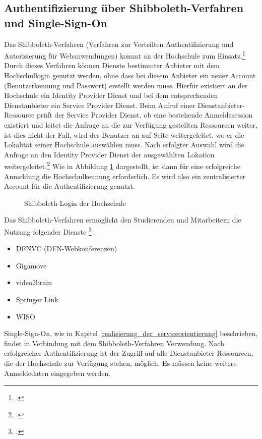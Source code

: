 \subsection{Authentifizierung über Shibboleth-Verfahren und Single-Sign-On}
\label{shibboleth_sso} 

Das Shibboleth-Verfahren (Verfahren zur Verteilten Authentifizierung und Autorisierung für 
Webanwendungen) kommt an der Hochschule zum Einsatz.\footcite[Vgl.][]{hsel_shibboleth_auth_2015}  
Durch dieses Verfahren können Dienste bestimmter Anbieter mit dem Hochschullogin genutzt werden, 
ohne dass bei diesem Anbieter ein neuer Account (Benutzerkennung und Passwort) erstellt werden 
muss. Hierfür existiert an der Hochschule ein Identity Provider Dienst und bei dem entsprechenden 
Dienstanbieter ein Service Provider Dienst.  Beim Aufruf einer Dienstanbieter-Ressource prüft der 
Service Provider Dienst, ob eine bestehende Anmeldesession existiert und leitet die Anfrage an die zur 
Verfügung gestellten Ressourcen weiter, ist dies nicht der Fall, wird der Benutzer an auf Seite 
weitergeleitet, wo er die Lokalität seiner Hochschule auswählen muss. Nach erfolgter Auswahl wird die 
Anfrage an den Identity Provider Dienst der ausgewählten Lokation 
weitergeleitet.\footcite[Vgl.][]{kit_shibboleth_2012} Wie in Abbildung \ref{fig_shibboleth_hs} 
dargestellt, ist dann für eine erfolgreiche Anmeldung die Hochschulkennung erforderlich. Es wird also 
ein zentralisierter Account für die Authentifizierung genutzt.  

\begin{figure}[h]
	\centering
	\caption{Shibboleth-Login der Hochschule \protect\footnotemark}
	\label{fig_shibboleth_hs}
\end{figure}
\clearpage
Das Shibboleth-Verfahren ermöglicht den Studierenden und Mitarbeitern die Nutzung folgender Dienste \footcite{hsel_shibboleth_vpn_2015} :

\begin{itemize}
	\item DFNVC (DFN-Webkonferenzen)
	\item Gigamove
	\item video2brain
	\item Springer Link	
	\item WISO	
\end{itemize}

Single-Sign-On, wie in Kapitel \ref{realisierung_der_serviceorientierung} beschrieben, findet in Verbindung mit dem Shibboleth-Verfahren Verwendung. Nach erfolgreicher Authentifizierung ist der Zugriff auf alle Dienstanbieter-Ressourcen, die der Hochschule zur Verfügung stehen, möglich. Es müssen keine weitere Anmeldedaten eingegeben werden.

